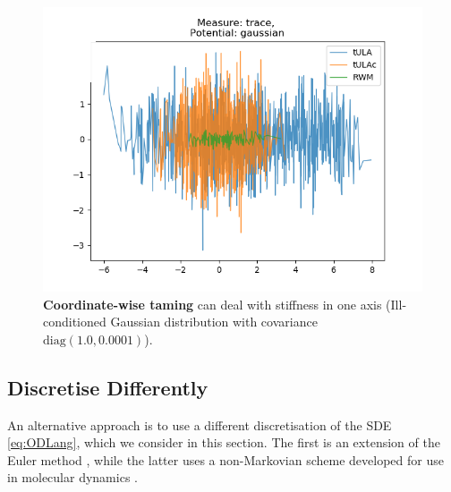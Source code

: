 \begin{figure}[H]
\centering
  \begin{minipage}[b]{0.49\textwidth}
  \centering
    \includegraphics[width=\textwidth]{Figures/tula_tulac_rwm_stiff.png}
  \end{minipage} %
   \caption{\textbf{Coordinate-wise taming} can deal with stiffness in one axis (Ill-conditioned Gaussian distribution with covariance $\text{diag}(1.0, 0.0001)$).}
   \label{fig:stifftULAc}
\end{figure}




\subsection{Discretise Differently}
An alternative approach is to use a different discretisation of the SDE \eqref{eq:ODLang}, which we consider in this section. The first is an extension of the Euler method \cite{Sabanis18tHOLA}, while the latter uses a non-Markovian scheme developed for use in molecular dynamics \cite{LM12}.
